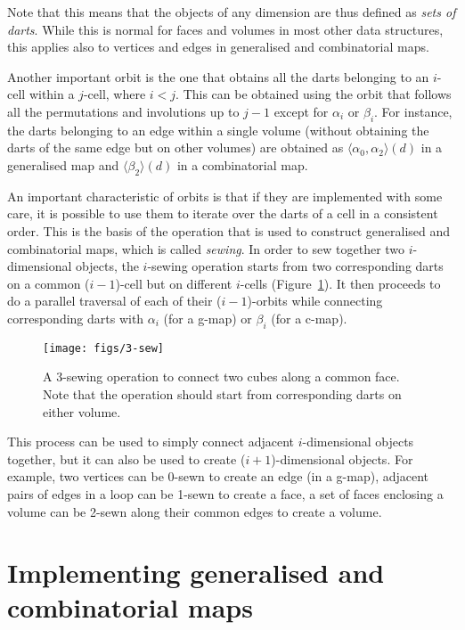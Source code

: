 Note that this means that the objects of any dimension are thus defined as \emph{sets of darts}.
While this is normal for faces and volumes in most other data structures, this applies also to vertices and edges in generalised and combinatorial maps.

Another important orbit is the one that obtains all the darts belonging to an \(i\)-cell within a \(j\)-cell, where \(i < j\).
This can be obtained using the orbit that follows all the permutations and involutions up to \(j-1\) except for \(\alpha_i\) or \(\beta_i\).
For instance, the darts belonging to an edge within a single volume (without obtaining the darts of the same edge but on other volumes) are obtained as \(\langle \alpha_0, \alpha_2 \rangle(d)\) in a generalised map and \(\langle \beta_2 \rangle(d)\) in a combinatorial map.

An important characteristic of orbits is that if they are implemented with some care, it is possible to use them to iterate over the darts of a cell in a consistent order.
This is the basis of the operation that is used to construct generalised and combinatorial maps, which is called \emph{sewing}.
In order to sew together two \(i\)-dimensional objects, the \(i\)-sewing operation starts from two corresponding darts on a common (\(i-1\))-cell but on different \(i\)-cells (Figure~\ref{fig:3-sew}).
It then proceeds to do a parallel traversal of each of their (\(i-1\))-orbits while connecting corresponding darts with \(\alpha_i\) (for a g-map) or \(\beta_i\) (for a c-map).

\begin{figure}
\centering
\texttt{[image: figs/3-sew]}
\caption{A 3-sewing operation to connect two cubes along a common face.
Note that the operation should start from corresponding darts on either volume.}%
\label{fig:3-sew}
\end{figure}

This process can be used to simply connect adjacent \(i\)-dimensional objects together, but it can also be used to create (\(i+1\))-dimensional objects.
For example, two vertices can be 0-sewn to create an edge (in a g-map), adjacent pairs of edges in a loop can be 1-sewn to create a face, a set of faces enclosing a volume can be 2-sewn along their common edges to create a volume.

\section{Implementing generalised and combinatorial maps}

